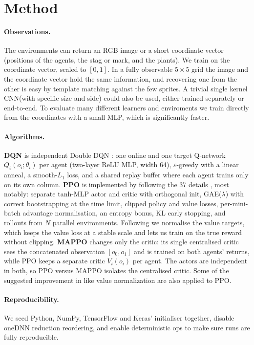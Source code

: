 \documentclass{article}
\begin{document}
\section{Method}
\label{sec:method}

\paragraph{Observations.} The environments can return an RGB image
or a short coordinate vector (positions of the agents, the stag or mark, and the plants). We
train on the coordinate vector, scaled to $[0,1]$. In a fully
observable $5\times5$ grid the image and the coordinate vector hold the same information, and
recovering one from the other is easy by template matching against the few sprites. A trivial 
single kernel CNN(with specific size and side) could also be used, either trained separately or end-to-end. To evaluate many different learners and enviroments we train
directly from the coordinates with a small MLP, which is significantly faster.

\paragraph{Algorithms.} \textbf{DQN} is independent Double
DQN \citep{ddqn2016}: one online and one target Q-network $Q_i(o_i;\theta_i)$ per agent
(two-layer ReLU MLP, width 64), $\varepsilon$-greedy with a linear anneal, a smooth-$L_1$ loss, and a
shared replay buffer where each agent trains only on its own column. \textbf{PPO}
is \citep{ppo2017} implemented by following the 37 details \citep{ppo37}, most notably: separate
tanh-MLP actor and critic with orthogonal init, GAE($\lambda$) \citep{gae2016} with correct
bootstrapping at the time limit, clipped policy and value losses, per-mini-batch advantage
normalisation, an entropy bonus, KL early stopping, and rollouts from $N$ parallel
environments. Following \citet{mappo2021} we normalise the value targets, which keeps the
value loss at a stable scale and lets us train on the true reward without clipping. \textbf{MAPPO}
changes only the critic: its single centralised critic sees the concatenated observation
$[o_0,o_1]$ and is trained on both agents' returns, while PPO keeps a separate critic
$V_i(o_i)$ per agent. The actors are independent in both, so PPO versus MAPPO isolates the
centralised critic. Some of the suggested improvement in \citet{mappo2021} like value normalization are also applied to PPO.

\paragraph{Reproducibility.} We seed Python, NumPy, TensorFlow and
Keras' initialiser together, disable oneDNN reduction reordering, and enable deterministic ops
to make sure runs are fully reproducible.
\end{document}
